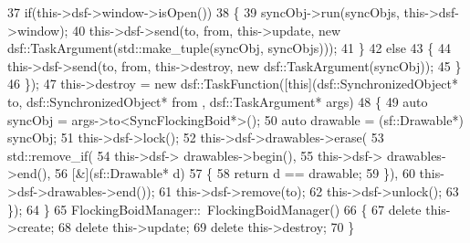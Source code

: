\begin{DoxyCodeInclude}
37                                              \textcolor{keywordflow}{if}(this->dsf->window->isOpen())
38                                              \{
39                                                  syncObj->run(syncObjs, this->dsf->window);
40                                                  this->dsf->send(to, from, this->update, \textcolor{keyword}{new} 
      dsf::TaskArgument(std::make\_tuple(syncObj, syncObjs)));
41                                              \}
42                                              \textcolor{keywordflow}{else}
43                                              \{
44                                                  this->dsf->send(to, from, this->destroy, \textcolor{keyword}{new} 
      dsf::TaskArgument(syncObj));
45                                              \}
46                                          \});
47     this->destroy = \textcolor{keyword}{new} dsf::TaskFunction([\textcolor{keyword}{this}](dsf::SynchronizedObject* to, dsf::SynchronizedObject* from
      , dsf::TaskArgument* args)
48                                           \{
49                                               \textcolor{keyword}{auto} syncObj = args->to<SyncFlockingBoid*>();
50                                               \textcolor{keyword}{auto} drawable = (sf::Drawable*) syncObj;
51                                               this->dsf->lock();
52                                               this->dsf->drawables->erase(
53                                                                           std::remove\_if(
54                                                                                          this->dsf->
      drawables->begin(),
55                                                                                          this->dsf->
      drawables->end(),
56                                                                                          [&](sf::Drawable* 
      d)
57                                                                                          \{
58                                                                                              \textcolor{keywordflow}{return} d == 
      drawable;
59                                                                                          \}),
60                                                                           this->dsf->drawables->end());
61                                               this->dsf->remove(to);
62                                               this->dsf->unlock();
63                                           \});
64 \}
65 FlockingBoidManager::~FlockingBoidManager()
66 \{
67     \textcolor{keyword}{delete} this->create;
68     \textcolor{keyword}{delete} this->update;
69     \textcolor{keyword}{delete} this->destroy;
70 \}
\end{DoxyCodeInclude}
